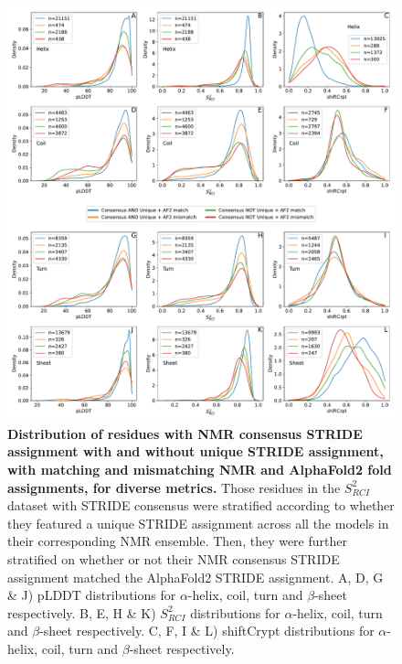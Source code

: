 \begin{figure}[H]
    \centering
    \includegraphics[width=\textwidth]{pLDDT/plddt_figures/with_and_without_unique_nmr_strideCons_stratified_match_mismatch.pdf}
    \caption{\textbf{Distribution of residues with  NMR consensus STRIDE assignment with and without unique STRIDE assignment, with matching and mismatching NMR and AlphaFold2 fold assignments, for diverse metrics.} Those residues in the \(S^{2}_{RCI}\) dataset with STRIDE consensus were stratified according to whether they featured a unique STRIDE assignment across all the models in their corresponding NMR ensemble. Then, they were further stratified on whether or not their NMR consensus STRIDE assignment matched the AlphaFold2 STRIDE assignment. A, D, G \& J) pLDDT distributions for $\alpha$-helix, coil, turn and $\beta$-sheet respectively. B, E, H \& K) \(S^{2}_{RCI}\) distributions for $\alpha$-helix, coil, turn and $\beta$-sheet respectively. C, F, I \& L) shiftCrypt distributions for $\alpha$-helix, coil, turn and $\beta$-sheet respectively.}

    \label{fig:unique_and_or_cons_match_af2}
\end{figure}

